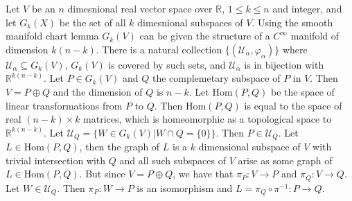 \documentclass{article}                                                        %
\begin{document}
        \begin{example}
            Let $V$ be an $n$ dimesnional real vector space over $\mathbb{R}$,
            $1\leq{k}\leq{n}$ and integer, and let $G_{k}(X)$ be the set of
            all $k$ dimesnional subspaces of $V$. Using the smooth manifold
            chart lemma $G_{k}(V)$ can be given the structure of a $C^{\infty}$
            manifold of dimension $k(n-k)$. There is a natural collection
            $\{(\mathcal{U}_{\alpha},\varphi_{\alpha})\}$ where
            $\mathcal{U}_{\alpha}\subseteq{G}_{k}(V)$, $G_{k}(V)$ is covered by
            such sets, and $\mathcal{U}_{\alpha}$ is in bijection with
            $\mathbb{R}^{k(n-k)}$. Let $P\in{G}_{k}(V)$ and $Q$ the complemetary
            subspace of $P$ in $V$. Then $V=P\oplus{Q}$ and the dimension of $Q$
            is $n-k$. Let $\textrm{Hom}(P,Q)$ be the space of linear
            transformations from $P$ to $Q$. Then $\textrm{Hom}(P,Q)$ is equal
            to the space of real $(n-k)\times{k}$ matrices, which is
            homeomorphic as a topological space to $\mathbb{R}^{k(n-k)}$. Let
            $\mathcal{U}_{Q}=\{W\in{G}_{k}(V)|W\cap{Q}=\{0\}\}$. Then
            $P\in\mathcal{U}_{Q}$. Let $L\in\textrm{Hom}(P,Q)$, then the graph
            of $L$ is a $k$ dimensional subspace of $V$ with trivial
            intersection with $Q$ and all such subspaces of $V$ arise as some
            graph of $L\in\textrm{Hom}(P,Q)$. But since $V=P\oplus{Q}$, we have
            that $\pi_{P}:V\rightarrow{P}$ and $\pi_{Q}:V\rightarrow{Q}$. Let
            $W\in\mathcal{U}_{Q}$. Then $\pi_{P}:W\rightarrow{P}$ is an
            isomorphism and $L=\pi_{Q}\circ\pi^{\minus{1}}:P\rightarrow{Q}$.
        \end{example}
\end{document}
